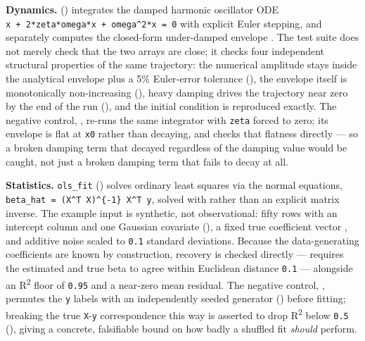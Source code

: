 \documentclass[
]{article}
\begin{document}
\textbf{Dynamics.} 
() integrates the damped harmonic
oscillator ODE
\texttt{x\textquotesingle{}\textquotesingle{}\ +\ 2*zeta*omega*x\textquotesingle{}\ +\ omega\^{}2*x\ =\ 0}
with explicit Euler stepping, and separately computes the closed-form
under-damped envelope . The test suite
does not merely check that the two arrays are close; it checks four
independent structural properties of the same trajectory: the numerical
amplitude stays inside the analytical envelope plus a 5\% Euler-error
tolerance
(),
the envelope itself is monotonically non-increasing
(),
heavy damping drives the trajectory near zero by the end of the run
(), and the
initial condition is reproduced exactly. The negative control,
, re-runs the same integrator with
\texttt{zeta} forced to zero; its envelope is flat at \texttt{x0} rather
than decaying, and  checks
that flatness directly --- so a broken damping term that decayed
regardless of the damping value would be caught, not just a broken
damping term that fails to decay at all.

\textbf{Statistics.} \texttt{ols\_fit}
() solves ordinary least squares
via the normal equations,
\texttt{beta\_hat\ =\ (X\^{}T\ X)\^{}\{-1\}\ X\^{}T\ y}, solved with
 rather than an explicit matrix inverse. The
example input is synthetic, not observational: fifty rows with an
intercept column and one Gaussian covariate
(), a fixed true coefficient
vector , and additive noise scaled to
\texttt{0.1} standard deviations. Because the data-generating
coefficients are known by construction, recovery is checked directly ---
 requires the estimated and true
beta to agree within Euclidean distance \texttt{0.1} --- alongside an R\texorpdfstring{\textsuperscript{2}}{2}
floor of \texttt{0.95} and a near-zero mean residual. The negative
control, , permutes the \texttt{y} labels
with an independently seeded generator
() before fitting; breaking
the true \texttt{X}-\texttt{y} correspondence this way is asserted to
drop R\texorpdfstring{\textsuperscript{2}}{2} below \texttt{0.5}
(), giving a concrete,
falsifiable bound on how badly a shuffled fit \emph{should} perform.
\end{document}
